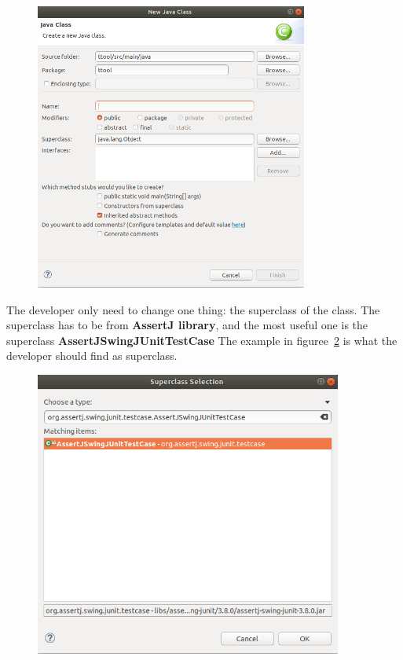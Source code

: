 \documentclass[12pt]{article}
\begin{document}
\begin{figure}[H]
\begin{center}
\includegraphics[width=0.8\textwidth]{images/image16.png}
\end{center}
\caption{}
\label{fig:image15}
\end{figure}

The developer only need to change one thing: the superclass of the class. The superclass has to be from \textbf{AssertJ library}, and the most useful one is the superclass \textbf{AssertJSwingJUnitTestCase} \newline
The example in figuree~\ref{fig:image16} is what the developer should find as superclass.

\begin{figure}[H]
\begin{center}
\includegraphics[width=0.9\textwidth]{images/image17.png}
\end{center}
\caption{}
\label{fig:image16}
\end{figure}
\end{document}
